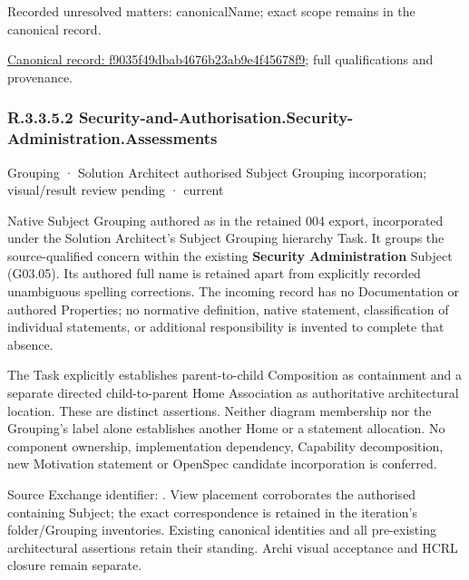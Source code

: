 {\small Recorded unresolved matters: canonicalName; exact scope remains in the canonical record.}\par
{\footnotesize \href{../../../../continuum/grouping/f9035f49dbab4676b23ab9e4f45678f9.md}{Canonical record: f9035f49dbab4676b23ab9e4f45678f9}; full qualifications and provenance.}\par
\subsubsection*{R.3.3.5.2 Security-and-Authorisation.Security-Administration.Assessments}
\label{navigation:R.3.3.5.2}

\label{element:b1997b3f14724bb983c06963fa7b4ea6}
{\small Grouping · Solution Architect authorised Subject Grouping incorporation; visual/result review pending · current}\par

Native Subject Grouping authored as \texttt{} in the retained 004 export,
incorporated under the Solution Architect's Subject Grouping hierarchy Task.
It groups the source-qualified \texttt{} concern within
the existing \textbf{Security Administration} Subject (G03.05). Its authored full name
is retained apart from explicitly recorded unambiguous spelling corrections.
The incoming record has no Documentation or authored Properties; no normative
definition, native statement, classification of individual statements, or
additional responsibility is invented to complete that absence.



The Task explicitly establishes parent-to-child Composition as containment and
a separate directed child-to-parent Home Association as authoritative architectural
location. These are distinct assertions. Neither diagram membership nor the
Grouping's label alone establishes another Home or a statement allocation.
No component ownership, implementation dependency, Capability decomposition,
new Motivation statement or OpenSpec candidate incorporation is conferred.



Source Exchange identifier: \texttt{}. View placement corroborates
the authorised containing Subject; the exact correspondence is retained in the
iteration's folder/Grouping inventories. Existing canonical identities and all
pre-existing architectural assertions retain their standing. Archi visual
acceptance and HCRL closure remain separate.


